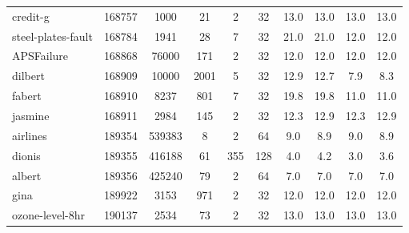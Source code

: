 \documentclass[11pt]{article}
\begin{document}
\begin{table}[H]
{\begin{tabular}{@{}lccccc|cc|cc@{}}
credit-g                                    & 168757         & 1000        & 21         & 2         & 32          & 13.0                     & 13.0          & 13.0                        & 13.0              \\
steel-plates-fault                          & 168784         & 1941        & 28         & 7         & 32          & 21.0                     & 21.0          & 12.0                        & 12.0              \\
APSFailure                                  & 168868         & 76000       & 171        & 2         & 32          & 12.0                     & 12.0          & 12.0                        & 12.0              \\
dilbert                                     & 168909         & 10000       & 2001       & 5         & 32          & 12.9                     & 12.7          & 7.9                         & 8.3               \\
fabert                                      & 168910         & 8237        & 801        & 7         & 32          & 19.8                     & 19.8          & 11.0                        & 11.0              \\
jasmine                                     & 168911         & 2984        & 145        & 2         & 32          & 12.3                     & 12.9          & 12.3                        & 12.9              \\
airlines                                    & 189354         & 539383      & 8          & 2         & 64          & 9.0                      & 8.9           & 9.0                         & 8.9               \\
dionis                                      & 189355         & 416188      & 61         & 355       & 128         & 4.0                      & 4.2           & 3.0                         & 3.6               \\
albert                                      & 189356         & 425240      & 79         & 2         & 64          & 7.0                      & 7.0           & 7.0                         & 7.0               \\
gina                                        & 189922         & 3153        & 971        & 2         & 32          & 12.0                     & 12.0          & 12.0                        & 12.0              \\
ozone-level-8hr                             & 190137         & 2534        & 73         & 2         & 32          & 13.0                     & 13.0          & 13.0                        & 13.0              \\

\end{tabular}}
\end{table}
\end{document}
